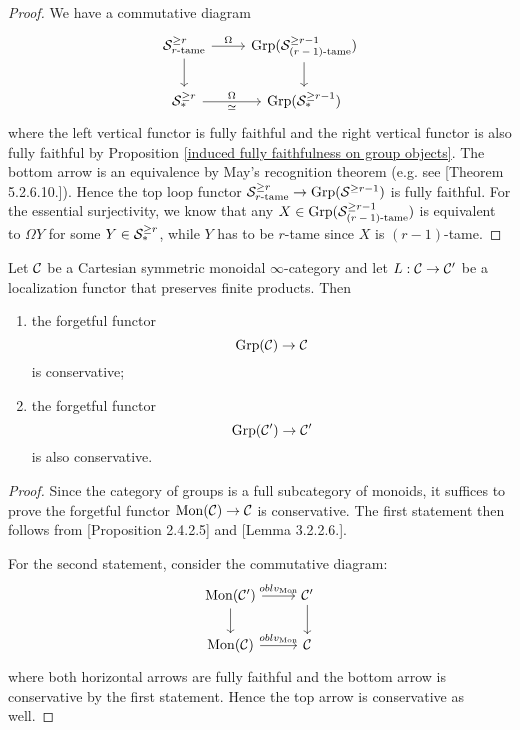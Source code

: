 \begin{proof}
	We have a commutative diagram 
	\[
	\begin{tikzcd}
		\CS^{\geq r}_{\text{$r$-tame}} & \Grp(\CS^{\geq r-1}_{\text{($r-1$)-tame}})\\
		\CS^{\geq r}_*   &  \Grp(\CS^{\geq r-1}_{*})  	
	\arrow[from=1-1, to=1-2,"\Omega"]
	\arrow[from=2-1, to=2-2, "\Omega","\simeq" below]
	\arrow[from=1-1, to=2-1]
	\arrow[from=1-2, to=2-2]
	\end{tikzcd}
	\]
	where the left vertical functor is fully faithful and the right vertical functor is also fully faithful by Proposition \ref{induced fully faithfulness on group objects}. The bottom arrow is an equivalence by May's recognition theorem (e.g. see \cite{HA}[Theorem 5.2.6.10.]). Hence the top loop functor ${\mathcal{S}}^{\geq r}_{\text{$r$-tame}} \to \operatorname{Grp}({\mathcal{S}}^{\geq r-1})$ is fully faithful.
	For the essential surjectivity, we know that any $X\in \operatorname{Grp}({\mathcal{S}}^{\geq r-1}_{\text{($r-1$)-tame}})$ is equivalent to $\Omega Y$ for some $Y\in {\mathcal{S}}^{\geq r}_*$, while $Y$ has to be $r$-tame since $X$ is $(r-1)$-tame.
	
\end{proof}

\begin{lemma}
\label{conservativity of forgetful functor (general)}
	Let ${\mathcal{C}}$ be a Cartesian symmetric monoidal $\infty$-category and let $L:{\mathcal{C}}\to {\mathcal{C}}'$ be a localization functor that preserves finite products.
	Then 
	\begin{enumerate}
		\item the forgetful functor
	\[
	\operatorname{Grp}({\mathcal{C}})\to {\mathcal{C}}
	\]
	is conservative;
	\item the forgetful functor
	\[
	\operatorname{Grp}({\mathcal{C}}')\to {\mathcal{C}}'
	\]
	is also conservative.
	\end{enumerate}
\end{lemma}
\begin{proof}
	Since the category of groups is a full subcategory of monoids, it suffices to prove the forgetful functor $\operatorname{Mon}({\mathcal{C}})\to {\mathcal{C}}$ is conservative.
	The first statement then follows from \cite{HA}[Proposition 2.4.2.5] and \cite{HA}[Lemma 3.2.2.6.].
	
	For the second statement, consider the commutative diagram:
	\[
\begin{tikzcd}
	\Mon(\CC') & \CC'\\
	\Mon(\CC) & 
	\CC	
	\arrow[from=1-1, to= 1-2, "\oblv_{\Mon}"]
	\arrow[from=1-1, to=2-1]
	\arrow[from=1-2, to=2-2]
	\arrow[from=2-1, to= 2-2, "\oblv_{\Mon}"]
\end{tikzcd}
\]
where both horizontal arrows are fully faithful and the bottom arrow is conservative by the first statement. Hence the top arrow is conservative as well.
\end{proof}

